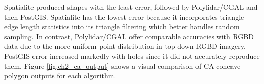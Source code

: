 Spatialite produced shapes with the least error, followed by Polylidar/CGAL and then PostGIS.  Spatialite has the lowest error because it incorporates triangle edge length statistics into its triangle filtering which better handles random sampling. In contrast, Polylidar/CGAL offer comparable accuracies with RGBD data due to the more uniform point distribution in top-down RGBD imagery. PostGIS error increased markedly with holes since it did not accurately reproduce them. 
Figure \ref{fig:ch2_ca_output} shows a visual comparison of CA concave polygon outputs for each algorithm. 


